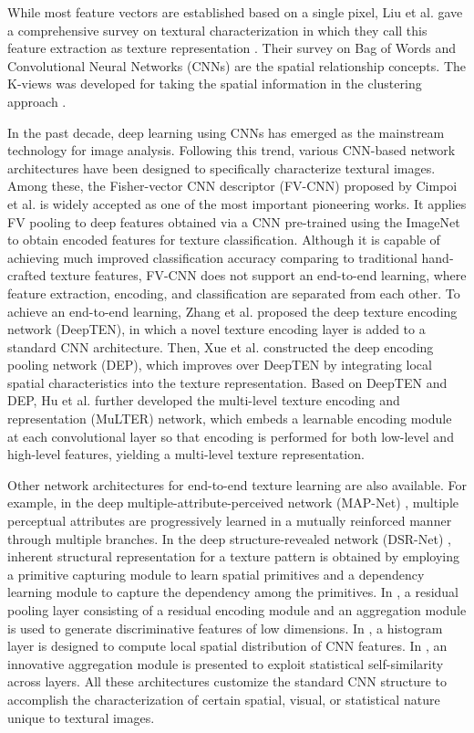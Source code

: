 \documentclass{aci}
\numberwithin{equation}{section}
\begin{document}
While most feature vectors are established based on a single pixel, Liu et al.
gave a comprehensive survey on textural characterization in which they call this
feature extraction as texture representation \cite{liu_bow_2019}. Their survey
on Bag of Words and Convolutional Neural Networks (CNNs)
\cite{krizhevsky_imagenet_2017} are the spatial relationship concepts. The
K-views was developed for taking the spatial information in the clustering
approach \cite{hung_image_2019}.

In the past decade, deep learning using CNNs has emerged as the mainstream
technology for image analysis. Following this trend, various CNN-based network
architectures have been designed to specifically characterize textural images.
Among these, the Fisher-vector CNN descriptor (FV-CNN) proposed by Cimpoi et
al. \cite{cimpoi_deep_2015} is widely accepted as one of the most important
pioneering works. It applies FV pooling to deep features obtained via a CNN
pre-trained using the ImageNet \cite{krizhevsky_imagenet_2017} to obtain encoded features
for texture classification. Although it is capable of achieving much improved
classification accuracy comparing to traditional hand-crafted texture features,
FV-CNN does not support an end-to-end learning, where feature extraction,
encoding, and classification are separated from each other. To achieve an
end-to-end learning, Zhang et al. \cite{zhang_deep_2017} proposed the deep texture
encoding network (DeepTEN), in which a novel texture encoding layer is added to
a standard CNN architecture. Then, Xue et al. \cite{xue_deep_2018} constructed the
deep encoding pooling network (DEP), which improves over DeepTEN by integrating
local spatial characteristics into the texture representation. Based on DeepTEN
and DEP, Hu et al. \cite{hu_multi_2019} further developed the multi-level texture
encoding and representation (MuLTER) network, which embeds a learnable encoding
module at each convolutional layer so that encoding is performed for both
low-level and high-level features, yielding a multi-level texture
representation.

Other network architectures for end-to-end texture learning are also available.
For example, in the deep multiple-attribute-perceived network (MAP-Net)
\cite{zhai_deep_2019}, multiple perceptual attributes are progressively learned
in a mutually reinforced manner through multiple branches. In the deep
structure-revealed network (DSR-Net) \cite{zhai_deep_2020}, inherent structural
representation for a texture pattern is obtained by employing a primitive
capturing module to learn spatial primitives and a dependency learning module to
capture the dependency among the primitives. In \cite{mao_deep_2021}, a residual
pooling layer consisting of a residual encoding module and an aggregation module
is used to generate discriminative features of low dimensions. In
\cite{peeples_histogram_2021}, a histogram layer is designed to compute local
spatial distribution of CNN features. In \cite{chen_deep_2021}, an innovative
aggregation module is presented to exploit statistical self-similarity across
layers. All these architectures customize the standard CNN structure to
accomplish the characterization of certain spatial, visual, or statistical
nature unique to textural images.
\end{document}
